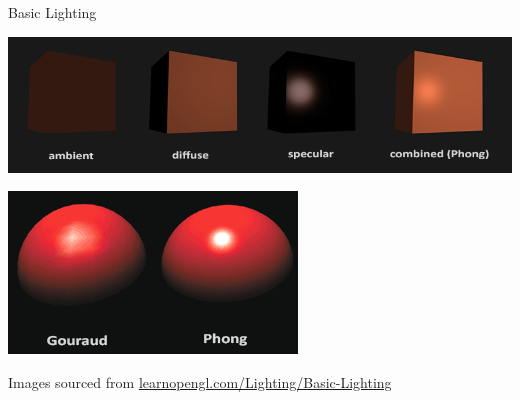 \documentclass{beamer}
\begin{document}
\begin{frame}[fragile]{Basic Lighting}
    \begin{center}
        \includegraphics[height=0.30\textheight]{images/basic_lighting_phong.png}
    \end{center}
    \begin{center}
        \includegraphics[height=0.30\textheight]{images/basic_lighting_gouruad.png}
    \end{center}
    \vfill{}
    {\footnotesize{Images sourced from \url{learnopengl.com/Lighting/Basic-Lighting}}}
\end{frame}
\end{document}

